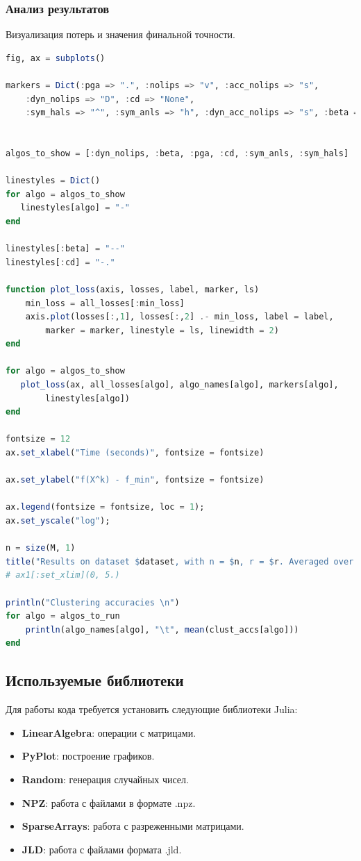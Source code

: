 \documentclass[a4paper,11pt]{article}
\begin{document}
\subsubsection{Анализ результатов}
Визуализация потерь и значения финальной точности.
\begin{lstlisting}[language=Julia, caption={Графики и анализ}, label={lst:example4}]
fig, ax = subplots()

markers = Dict(:pga => ".", :nolips => "v", :acc_nolips => "s",
    :dyn_nolips => "D", :cd => "None",
    :sym_hals => "^", :sym_anls => "h", :dyn_acc_nolips => "s", :beta => "None")


algos_to_show = [:dyn_nolips, :beta, :pga, :cd, :sym_anls, :sym_hals]

linestyles = Dict()
for algo = algos_to_show
   linestyles[algo] = "-" 
end

linestyles[:beta] = "--"
linestyles[:cd] = "-."

function plot_loss(axis, losses, label, marker, ls)
    min_loss = all_losses[:min_loss]
    axis.plot(losses[:,1], losses[:,2] .- min_loss, label = label,
        marker = marker, linestyle = ls, linewidth = 2)
end

for algo = algos_to_show
   plot_loss(ax, all_losses[algo], algo_names[algo], markers[algo],
        linestyles[algo]) 
end

fontsize = 12
ax.set_xlabel("Time (seconds)", fontsize = fontsize)

ax.set_ylabel("f(X^k) - f_min", fontsize = fontsize)

ax.legend(fontsize = fontsize, loc = 1);
ax.set_yscale("log");

n = size(M, 1)
title("Results on dataset $dataset, with n = $n, r = $r. Averaged over $n_runs runs")
# ax1[:set_xlim](0, 5.)

println("Clustering accuracies \n")
for algo = algos_to_run
    println(algo_names[algo], "\t", mean(clust_accs[algo]))
end
\end{lstlisting}

\subsection{Используемые библиотеки}
Для работы кода требуется установить следующие библиотеки Julia:
\begin{itemize}
    \item \textbf{LinearAlgebra}: операции с матрицами.
    \item \textbf{PyPlot}: построение графиков.
    \item \textbf{Random}: генерация случайных чисел.
    \item \textbf{NPZ}: работа с файлами в формате .npz.
    \item \textbf{SparseArrays}: работа с разреженными матрицами.
    \item \textbf{JLD}: работа с файлами формата .jld.
\end{itemize}
\end{document}

